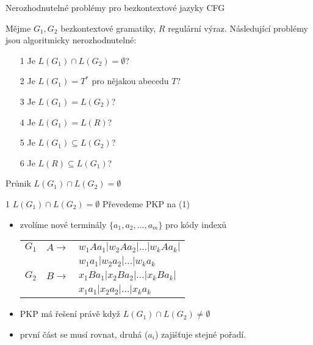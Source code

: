    
    \begin{frame}{Nerozhodnutelné problémy pro bezkontextové jazyky CFG}
    \begin{theorem}
    Mějme $G_1,G_2$ bezkontextové gramatiky, $R$ regulární výraz. Následující problémy jsou algoritmicky nerozhodnutelné:
    \begin{itemize}
        \item[1] Je $L(G_1)\cap L(G_2)=\emptyset$?
        \item[2] Je $L(G_1)= T^*$ pro nějakou abecedu $T$?
        \item[3] Je $L(G_1)= L(G_2)$?
        \item[4] Je $L(G_1)= L(R)$?
        \item[5] Je $L(G_1)\subseteq L(G_2)$?
        \item[6] Je $L(R)\subseteq L(G_1)$?
    \end{itemize}
    \end{theorem}
    \end{frame}
    
    
    \begin{frame}{Průnik $L(G_1)\cap L(G_2)=\emptyset$}
    \begin{proofm}{{ 1 $L(G_1)\cap L(G_2)=\emptyset$}}
    Převedeme PKP na (1)
    \begin{itemize}
        \item zvolíme nové terminály $\{a_1,a_2,\ldots, a_m\}$ pro kódy indexů
    \begin{tabular}{c l l}
    $G_1$ & $A\rightarrow$ & $w_1Aa_1 |w_2Aa_2 |\ldots |w_kAa_k |  $\\
     &  & $w_1a_1 |w_2a_2 |\ldots |w_ka_k  $\\
    $G_2$ & $B\rightarrow$ & $x_1Ba_1 |x_2Ba_2 |\ldots |x_kBa_k |  $\\
     &  & $x_1a_1 |x_2a_2 |\ldots |x_ka_k   $
    \end{tabular}
    \item PKP má řešení právě když $L(G_1)\cap L(G_2)\neq \emptyset$
    \item první část se musí rovnat, druhá ($a_i$) zajišťuje stejné pořadí.
    \end{itemize}
    \end{proofm}
    \end{frame}
    
